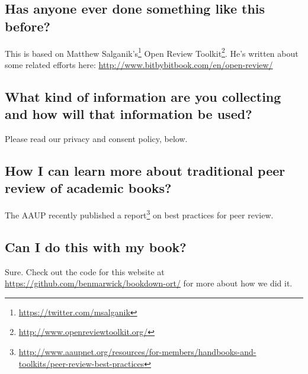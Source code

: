 \documentclass[12pt,]{krantz}
\renewcommand{\href}[2]{#2\footnote{\url{#1}}}
\theoremstyle{definition}
\theoremstyle{definition}
\theoremstyle{definition}
\theoremstyle{remark}
\begin{document}
\hypertarget{has-anyone-ever-done-something-like-this-before}{%
\subsection*{Has anyone ever done something like this
before?}\label{has-anyone-ever-done-something-like-this-before}}

This is based on \href{https://twitter.com/msalganik}{Matthew
Salganik's} \href{http://www.openreviewtoolkit.org/}{Open Review
Toolkit}. He's written about some related efforts here:
\url{http://www.bitbybitbook.com/en/open-review/}

\hypertarget{what-kind-of-information-are-you-collecting-and-how-will-that-information-be-used}{%
\subsection*{What kind of information are you collecting and how will
that information be
used?}\label{what-kind-of-information-are-you-collecting-and-how-will-that-information-be-used}}

Please read our privacy and consent policy, below.

\hypertarget{how-i-can-learn-more-about-traditional-peer-review-of-academic-books}{%
\subsection*{How I can learn more about traditional peer review of
academic
books?}\label{how-i-can-learn-more-about-traditional-peer-review-of-academic-books}}

The AAUP recently published
\href{http://www.aaupnet.org/resources/for-members/handbooks-and-toolkits/peer-review-best-practices}{a
report} on best practices for peer review.

\hypertarget{can-i-do-this-with-my-book}{%
\subsection*{Can I do this with my
book?}\label{can-i-do-this-with-my-book}}


Sure. Check out the code for this website at
\url{https://github.com/benmarwick/bookdown-ort/} for more about how we
did it.
\end{document}
